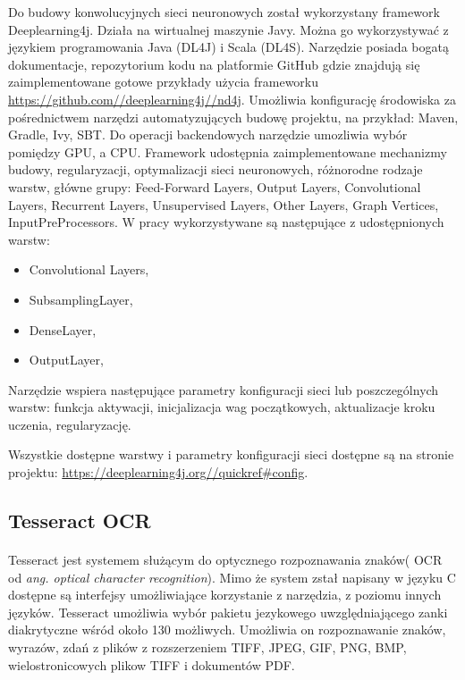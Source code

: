 \documentclass[a4paper,12pt]{article}
\begin{document}
        \par Do budowy konwolucyjnych sieci neuronowych został wykorzystany framework Deeplearning4j. Działa na wirtualnej maszynie Javy. Można go wykorzystywać z językiem programowania Java (DL4J) i Scala (DL4S). Narzędzie posiada bogatą dokumentacje, repozytorium kodu na platformie GitHub gdzie znajdują się zaimplementowane gotowe przykłady użycia frameworku \href{https://github.com//deeplearning4j//nd4j}{\url{https://github.com//deeplearning4j//nd4j}}. Umożliwia konfigurację środowiska za pośrednictwem narzędzi automatyzujących budowę projektu, na przykład: Maven, Gradle, Ivy, SBT. Do operacji backendowych narzędzie umozliwia wybór pomiędzy GPU, a CPU. Framework 
        udostępnia zaimplementowane mechanizmy budowy, regularyzacji, optymalizacji sieci neuronowych, różnorodne rodzaje warstw, główne grupy: Feed-Forward Layers, Output Layers, Convolutional Layers, Recurrent Layers,  Unsupervised Layers, Other Layers, Graph Vertices, InputPreProcessors. W pracy wykorzystywane są następujące z udostępnionych warstw: 
        \begin{itemize}
            \item Convolutional Layers,
            \item SubsamplingLayer,
            \item DenseLayer,
            \item OutputLayer,
        \end{itemize}
        \par Narzędzie wspiera następujące parametry konfiguracji sieci lub poszczególnych warstw: funkcja aktywacji, inicjalizacja wag początkowych, aktualizacje kroku uczenia, regularyzację. 
        \par Wszystkie dostępne warstwy i parametry konfiguracji sieci dostępne są na stronie projektu:
        \href{https://deeplearning4j.org//quickref\#config}{\url{https://deeplearning4j.org//quickref\#config}}.
        
	\subsection{Tesseract OCR}
	    \paragraph{} Tesseract jest systemem służącym do optycznego rozpoznawania znaków( OCR od \textit{ang. optical character recognition}). Mimo że system zstał napisany w języku C dostępne są interfejsy umożliwiające korzystanie z narzędzia, z poziomu innych języków. Tesseract umożliwia wybór pakietu jezykowego uwzględniającego zanki diakrytyczne wśród około 130 możliwych. Umożliwia on rozpoznawanie znaków, wyrazów, zdań z plików z rozszerzeniem TIFF, JPEG, GIF, PNG, BMP, wielostronicowych plikow TIFF i dokumentów PDF.
   
\end{document}
